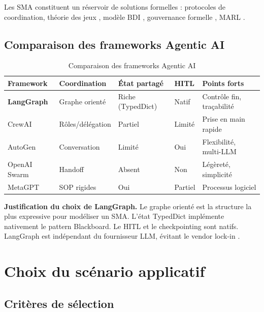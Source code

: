 \documentclass[12pt,a4paper]{report}
\begin{document}
Les SMA constituent un réservoir de solutions formelles \citep{analyse_comparative} :
protocoles de coordination, théorie des jeux \citep{generalsurvey2020},
modèle BDI \citep{maldonado2024}, gouvernance formelle \citep{milosevic2026},
MARL \citep{cmupaper2021}.

\section{Comparaison des frameworks Agentic AI}
\label{sec:frameworks}

\begin{table}[H]
\centering
\caption{Comparaison des frameworks Agentic AI \citep{vaidhyanathan2026}}
\label{tab:frameworks}
\begin{tabularx}{\textwidth}{L{2.3cm}L{2.5cm}C{1.8cm}C{1.5cm}L{4cm}}
\toprule
\textbf{Framework} & \textbf{Coordination} & \textbf{État partagé} & \textbf{HITL} & \textbf{Points forts} \\
\midrule
\textbf{LangGraph} & Graphe orienté & Riche (TypedDict) & Natif & Contrôle fin, traçabilité \\
CrewAI & Rôles/délégation & Partiel & Limité & Prise en main rapide \\
AutoGen & Conversation & Limité & Oui & Flexibilité, multi-LLM \\
OpenAI Swarm & Handoff & Absent & Non & Légèreté, simplicité \\
MetaGPT & SOP rigides & Oui & Partiel & Processus logiciel \\
\bottomrule
\end{tabularx}
\end{table}

\textbf{Justification du choix de LangGraph.} Le graphe orienté est la structure la
plus expressive pour modéliser un SMA. L'état TypedDict implémente nativement le
pattern Blackboard. Le HITL et le checkpointing sont natifs. LangGraph est
indépendant du fournisseur LLM, évitant le vendor lock-in \citep{vaidhyanathan2026}.

\chapter{Choix du scénario applicatif}
\label{chap:sujet}

\section{Critères de sélection}
\end{document}
